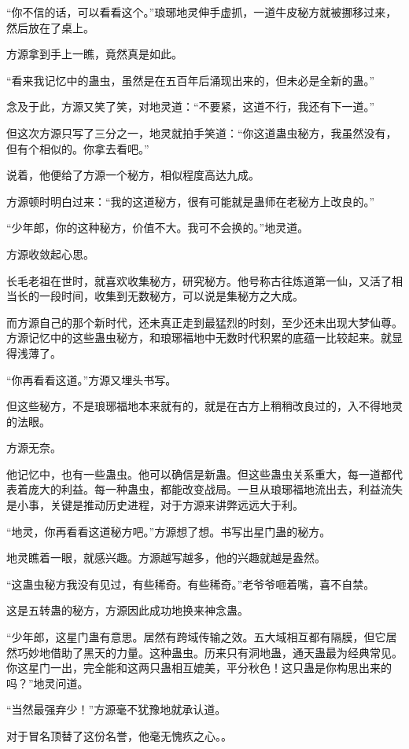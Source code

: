 \begin{this_body}
“你不信的话，可以看看这个。”琅琊地灵伸手虚抓，一道牛皮秘方就被挪移过来，然后放在了桌上。

方源拿到手上一瞧，竟然真是如此。

“看来我记忆中的蛊虫，虽然是在五百年后涌现出来的，但未必是全新的蛊。”

念及于此，方源又笑了笑，对地灵道：“不要紧，这道不行，我还有下一道。”

但这次方源只写了三分之一，地灵就拍手笑道：“你这道蛊虫秘方，我虽然没有，但有个相似的。你拿去看吧。”

说着，他便给了方源一个秘方，相似程度高达九成。

方源顿时明白过来：“我的这道秘方，很有可能就是蛊师在老秘方上改良的。”

“少年郎，你的这种秘方，价值不大。我可不会换的。”地灵道。

方源收敛起心思。

长毛老祖在世时，就喜欢收集秘方，研究秘方。他号称古往炼道第一仙，又活了相当长的一段时间，收集到无数秘方，可以说是集秘方之大成。

而方源自己的那个新时代，还未真正走到最猛烈的时刻，至少还未出现大梦仙尊。方源记忆中的这些蛊虫秘方，和琅琊福地中无数时代积累的底蕴一比较起来。就显得浅薄了。

“你再看看这道。”方源又埋头书写。

但这些秘方，不是琅琊福地本来就有的，就是在古方上稍稍改良过的，入不得地灵的法眼。

方源无奈。

他记忆中，也有一些蛊虫。他可以确信是新蛊。但这些蛊虫关系重大，每一道都代表着庞大的利益。每一种蛊虫，都能改变战局。一旦从琅琊福地流出去，利益流失是小事，关键是推动历史进程，对于方源来讲弊远远大于利。

“地灵，你再看看这道秘方吧。”方源想了想。书写出星门蛊的秘方。

地灵瞧着一眼，就感兴趣。方源越写越多，他的兴趣就越是盎然。

“这蛊虫秘方我没有见过，有些稀奇。有些稀奇。”老爷爷咂着嘴，喜不自禁。

这是五转蛊的秘方，方源因此成功地换来神念蛊。

“少年郎，这星门蛊有意思。居然有跨域传输之效。五大域相互都有隔膜，但它居然巧妙地借助了黑天的力量。这种蛊虫。历来只有洞地蛊，通天蛊最为经典常见。你这星门一出，完全能和这两只蛊相互媲美，平分秋色！这只蛊是你构思出来的吗？”地灵问道。

“当然最强弃少！”方源毫不犹豫地就承认道。

对于冒名顶替了这份名誉，他毫无愧疚之心。。


\end{this_body}
